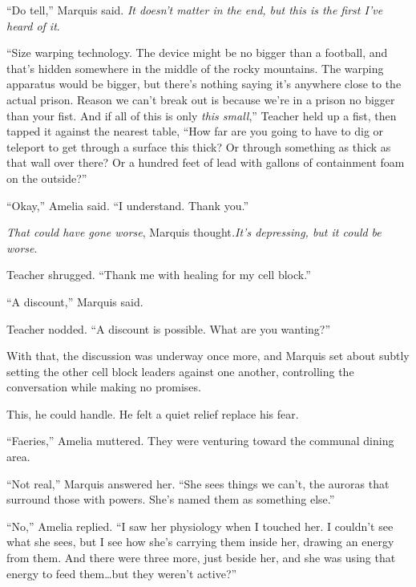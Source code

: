 ``Do tell,'' Marquis said.  \emph{It doesn't matter in the end, but this is the first I've heard of it}.



``Size warping technology.  The device might be no bigger than a football, and that's hidden somewhere in the middle of the rocky mountains.  The warping apparatus would be bigger, but there's nothing saying it's anywhere close to the actual prison.  Reason we can't break out is because we're in a prison no bigger than your fist.  And if all of this is only \emph{this small},'' Teacher held up a fist, then tapped it against the nearest table, ``How far are you going to have to dig or teleport to get through a surface this thick?  Or through something as thick as that wall over there?  Or a hundred feet of lead with gallons of containment foam on the outside?''



``Okay,'' Amelia said.  ``I understand.  Thank you.''



\emph{That could have gone worse}, Marquis thought\emph{.}\emph{It's depressing, but it could be worse}.



Teacher shrugged.  ``Thank me with healing for my cell block.''



``A discount,'' Marquis said.



Teacher nodded.  ``A discount is possible.  What are you wanting?''



With that, the discussion was underway once more, and Marquis set about subtly setting the other cell block leaders against one another, controlling the conversation while making no promises.



This, he could handle.  He felt a quiet relief replace his fear.



\sectionbreak



``Faeries,'' Amelia muttered.  They were venturing toward the communal dining area.



``Not real,'' Marquis answered her.  ``She sees things we can't, the auroras that surround those with powers.  She's named them as something else.''



``No,'' Amelia replied.  ``I saw her physiology when I touched her.  I couldn't see what she sees, but I see how she's carrying them inside her, drawing an energy from them.  And there were three more, just beside her, and she was using that energy to feed them\ldots but they weren't active?''




